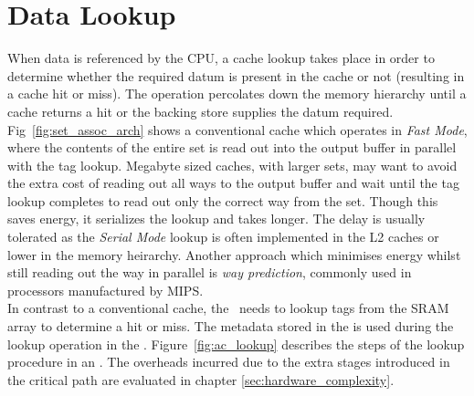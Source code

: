 \section{Data Lookup}

When data is referenced by the CPU, a cache lookup takes place in order to determine whether the required datum is present in the cache or not (resulting in a cache hit or miss). The operation percolates down the memory hierarchy until a cache returns a hit or the backing store supplies the datum required. Fig~\ref{fig:set_assoc_arch} shows a conventional cache which operates in \textit{Fast Mode}, where the contents of the entire set is read out into the output buffer in parallel with the tag lookup. Megabyte sized caches, with larger sets, may want to avoid the extra cost of reading out all ways to the output buffer and wait until the tag lookup completes to read out only the correct way from the set. Though this saves energy, it serializes the lookup and takes longer. The delay is usually tolerated as the \textit{Serial Mode} lookup is often implemented in the L2 caches or lower in the memory heirarchy. Another approach which minimises energy whilst still reading out the way in parallel is \textit{way prediction}\cite{patent:DataCacheWayPrediction,patent:WayPredictionVirtualHint}, commonly used in processors manufactured by MIPS.
\\

In contrast to a conventional cache, the \AC\ needs to lookup tags from the SRAM array to determine a hit or miss. The metadata stored in the  is used during the lookup operation in the \AC{}. Figure~\ref{fig:ac_lookup} describes the steps of the lookup procedure in an \AC{}. The overheads incurred due to the extra stages introduced in the critical path are evaluated in chapter \ref{sec:hardware_complexity}.


